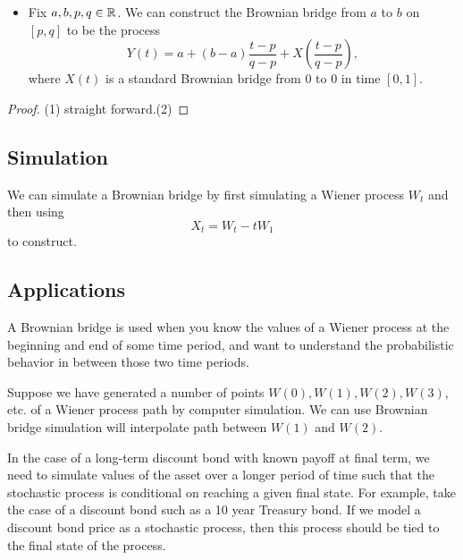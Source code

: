 \begin{refsection}
\begin{lemma}
\begin{itemize}
		\item Fix $ a,b, p,q\in \mathbb{R}$. We can construct the Brownian bridge from $a$ to $b$ on $[p,q]$ to be the process 
		$$Y(t) = a + (b-a)\frac{t-p}{q-p} + X(\frac{t-p}{q-p}),$$
		where $X(t)$ is a standard Brownian bridge from 0 to 0 in time $[0,1]$.
	\end{itemize}
\end{lemma}
\begin{proof}
	(1) straight forward.(2)
\end{proof}



\subsection{Simulation}
\begin{remark}
	We can simulate a Brownian bridge by first simulating a Wiener process $W_t$ and then using 
	$$X_t = W_t - tW_1$$
	to construct.\cite[27]{iacus2009simulation}	
\end{remark}
\subsection{Applications}

\begin{remark}
	A Brownian bridge is used when you know the values of a Wiener process at the beginning and end of some time period, and want to understand the probabilistic behavior in between those two time periods.	
\end{remark}

\begin{remark}
	Suppose we have generated a number of points $W(0), W(1), W(2), W(3)$, etc. of a Wiener process path by computer simulation. We can use Brownian bridge simulation will interpolate path between $W(1)$ and $W(2)$.
\end{remark}

\begin{remark}
	In the case of a long-term discount bond with known payoff at final term, we need to simulate values of the asset over a longer period of time such that the stochastic process is conditional on reaching a given final state. For example, take the case of a discount bond such as a 10 year Treasury bond. If we model a discount bond price as a stochastic process, then this process should be tied to the final state of the process.
\end{remark}






\end{refsection}
